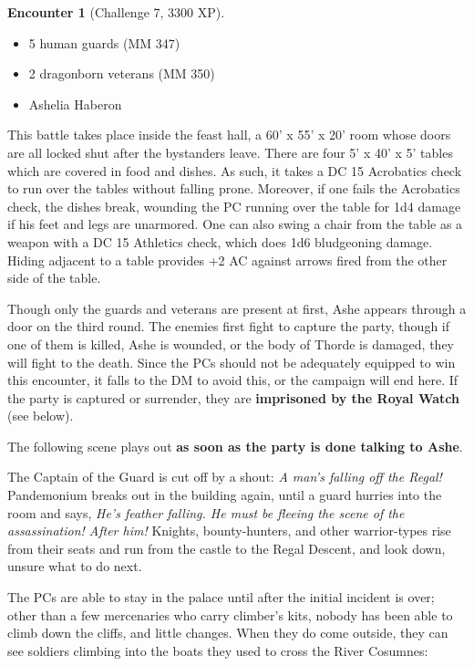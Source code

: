 \documentclass{report}
\theoremstyle{definition}
\newtheorem{enc}{Encounter}[chapter]
\begin{document}
\begin{enc}[Challenge 7, 3300 XP]
\leavevmode
\begin{itemize}
\item 5 human guards (MM 347)
\item 2 dragonborn veterans (MM 350)
\item Ashelia Haberon
\end{itemize}

This battle takes place inside the feast hall, a 60' x 55' x 20' room whose doors are all locked shut after the bystanders leave. There are four 5' x 40' x 5' tables which are covered in food and dishes. As such, it takes a DC 15 Acrobatics check to run over the tables without falling prone. Moreover, if one fails the Acrobatics check, the dishes break, wounding the PC running over the table for 1d4 damage if his feet and legs are unarmored. One can also swing a chair from the table as a weapon with a DC 15 Athletics check, which does 1d6 bludgeoning damage. Hiding adjacent to a table provides +2 AC against arrows fired from the other side of the table. 

Though only the guards and veterans are present at first, Ashe appears through a door on the third round.  The enemies first fight to capture the party, though if one of them is killed, Ashe is wounded, or the body of Thorde is damaged, they will fight to the death. Since the PCs should not be adequately equipped to win this encounter, it falls to the DM to avoid this, or the campaign will end here. If the party is captured or surrender, they are \textbf{imprisoned by the Royal Watch} (see below).
\end{enc}

The following scene plays out \textbf{as soon as the party is done talking to Ashe}.

\begin{displayquote}
The Captain of the Guard is cut off by a shout: \textit{A man's falling off the Regal!}  Pandemonium breaks out in the building again, until a guard hurries into the room and says, \textit{He's feather falling.  He must be fleeing the scene of the assassination!  After him!}  Knights, bounty-hunters, and other warrior-types rise from their seats and run from the castle to the Regal Descent, and look down, unsure what to do next.
\end{displayquote}

The PCs are able to stay in the palace until after the initial incident is over; other than a few mercenaries who carry climber's kits, nobody has been able to climb down the cliffs, and little changes.  When they do come outside, they can see soldiers climbing into the boats they used to cross the River Cosumnes:
\end{document}
